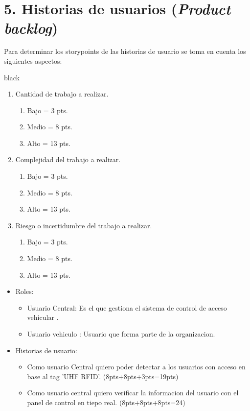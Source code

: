 \documentclass[
11pt, %
codirector, %
]{charter}
\begin{document}
\section{5. Historias de usuarios (\textit{Product backlog})}
\label{sec:backlog}
Para determinar los storypoints de las historias de usuario se toma en cuenta los siguientes
aspectos:
\begin{consigna}{black}
\begin{enumerate}
	\item Cantidad de trabajo a realizar.
		\begin{enumerate}
			\item Bajo = 3 pts.
			\item Medio = 8 pts.
			\item Alto = 13 pts.
		\end{enumerate}
		\item Complejidad del trabajo a realizar.
		\begin{enumerate}
			\item Bajo = 3 pts.
			\item Medio = 8 pts.
			\item Alto = 13 pts.
		\end{enumerate}
			\item Riesgo o incertidumbre del trabajo a realizar.
		\begin{enumerate}
			\item Bajo = 3 pts.
			\item Medio = 8 pts.
			\item Alto = 13 pts.
		\end{enumerate}
\end{enumerate}
\begin{itemize}
    \item  Roles:
\begin{itemize}
	\item Usuario Central: Es el que gestiona el sistema de control de acceso vehicular .
	\item Usuario vehiculo : Usuario que forma parte de la organizacion.
\end{itemize}
\item  Historias de usuario:
\begin{itemize}
	\item Como usuario Central quiero poder detectar a los usuarios con acceso en base al tag 'UHF RFID'. (8pts+8pts+3pts=19pts)
	\item Como usuario central quiero verificar la informacion del usuario con el panel de control en tiepo real. (8pts+8pts+8pts=24) 

\end{itemize}
\end{itemize}
\end{consigna}
\end{document}
